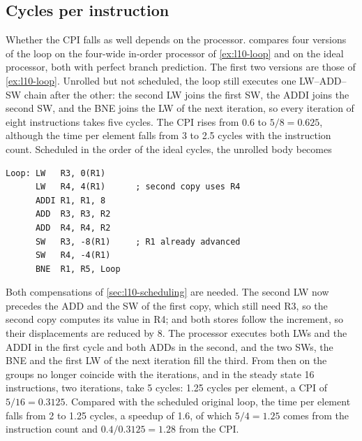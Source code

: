 \documentclass[../main.tex]{subfiles}
\begin{document}
\subsection{Cycles per instruction}
\label{sec:l10-unrolling-cpi}

Whether the CPI falls as well depends on the processor.
 compares four versions of the loop on the four-wide
in-order processor of \cref{ex:l10-loop} and on the ideal processor, both with
perfect branch prediction.  The first two versions are
those of \cref{ex:l10-loop}.  Unrolled but not scheduled, the loop still
executes one LW--ADD--SW chain after the other: the second LW joins the first
SW, the ADDI joins the second SW, and the BNE joins the LW of the next
iteration, so every iteration of eight instructions takes five cycles.  The
CPI rises from 0.6 to $5/8 = 0.625$, although the time per element falls from
3 to 2.5 cycles with the instruction count.  Scheduled in the order of the
ideal cycles, the unrolled body becomes
\begin{lstlisting}[language={[x86masm]Assembler}, numbers=none]
Loop: LW   R3, 0(R1)
      LW   R4, 4(R1)      ; second copy uses R4
      ADDI R1, R1, 8
      ADD  R3, R3, R2
      ADD  R4, R4, R2
      SW   R3, -8(R1)     ; R1 already advanced
      SW   R4, -4(R1)
      BNE  R1, R5, Loop
\end{lstlisting}
Both compensations of \cref{sec:l10-scheduling} are needed.  The second LW
now precedes the ADD and the SW of the first copy, which still need R3, so the
second copy computes its value in R4; and both stores follow the increment, so
their displacements are reduced by 8.  The processor executes both LWs and the
ADDI in the first cycle and both ADDs in the second, and the two SWs, the BNE
and the first LW of the next iteration fill the third.  From then on the
groups no longer coincide with the iterations, and in the steady state 16
instructions, two iterations, take 5 cycles: 1.25 cycles per element, a CPI of $5/16 = 0.3125$.  Compared
with the scheduled original loop, the time per element falls from 2 to 1.25
cycles, a speedup of 1.6, of which $5/4 = 1.25$ comes from the instruction
count and $0.4/0.3125 = 1.28$ from the CPI.
\end{document}

